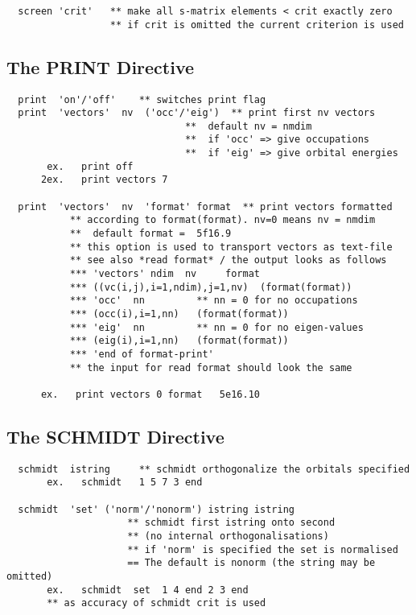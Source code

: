 \documentclass[11pt,fleqn]{article}
\begin{document}
{
\footnotesize
\begin{verbatim} 
  screen 'crit'   ** make all s-matrix elements < crit exactly zero
                  ** if crit is omitted the current criterion is used
\end{verbatim}
}

\subsection{The PRINT Directive}

{
\footnotesize
\begin{verbatim} 
  print  'on'/'off'    ** switches print flag
  print  'vectors'  nv  ('occ'/'eig')  ** print first nv vectors
                               **  default nv = nmdim
                               **  if 'occ' => give occupations
                               **  if 'eig' => give orbital energies
       ex.   print off
      2ex.   print vectors 7

  print  'vectors'  nv  'format' format  ** print vectors formatted
           ** according to format(format). nv=0 means nv = nmdim
           **  default format =  5f16.9
           ** this option is used to transport vectors as text-file
           ** see also *read format* / the output looks as follows
           *** 'vectors' ndim  nv     format
           *** ((vc(i,j),i=1,ndim),j=1,nv)  (format(format))
           *** 'occ'  nn         ** nn = 0 for no occupations
           *** (occ(i),i=1,nn)   (format(format))
           *** 'eig'  nn         ** nn = 0 for no eigen-values
           *** (eig(i),i=1,nn)   (format(format))
           *** 'end of format-print'
           ** the input for read format should look the same

      ex.   print vectors 0 format   5e16.10
\end{verbatim}
}

\subsection{The SCHMIDT Directive}

{
\footnotesize
\begin{verbatim} 
  schmidt  istring     ** schmidt orthogonalize the orbitals specified
       ex.   schmidt   1 5 7 3 end

  schmidt  'set' ('norm'/'nonorm') istring istring 
                     ** schmidt first istring onto second
                     ** (no internal orthogonalisations)
                     ** if 'norm' is specified the set is normalised
                     == The default is nonorm (the string may be omitted)
       ex.   schmidt  set  1 4 end 2 3 end
       ** as accuracy of schmidt crit is used
\end{verbatim}
}
\end{document}
